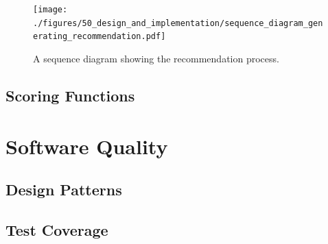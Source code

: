 \begin{figure}
    \centering
    \texttt{[image: ./figures/50\_design\_and\_implementation/sequence\_diagram\_generating\_recommendation.pdf]}
    \caption{A sequence diagram showing the recommendation process.}
    \label{fig:DesignImplementation:SequenceDiagramRecommendation}
\end{figure}



\subsection{Scoring Functions}

\section{Software Quality}
\label{sec:DesignImplementation:SoftwareQuality}

\subsection{Design Patterns}

\subsection{Test Coverage}
